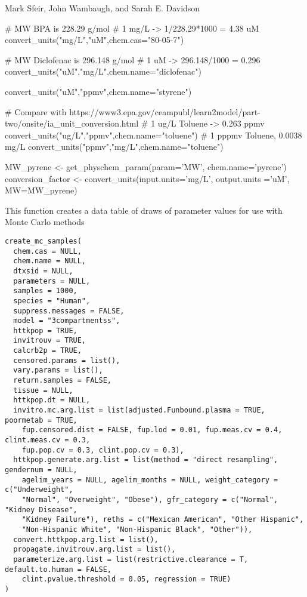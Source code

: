\documentclass[a4paper]{book}
\begin{document}
%
\begin{Author}\relax
Mark Sfeir, John Wambaugh, and Sarah E. Davidson
\end{Author}
%
\begin{Examples}
\begin{ExampleCode}

# MW BPA is 228.29 g/mol
# 1 mg/L -> 1/228.29*1000 = 4.38 uM
convert_units("mg/L","uM",chem.cas="80-05-7")

# MW Diclofenac is 296.148 g/mol
# 1 uM -> 296.148/1000 =  0.296
convert_units("uM","mg/L",chem.name="diclofenac")

convert_units("uM","ppmv",chem.name="styrene")

# Compare with https://www3.epa.gov/ceampubl/learn2model/part-two/onsite/ia_unit_conversion.html
# 1 ug/L Toluene -> 0.263 ppmv
convert_units("ug/L","ppmv",chem.name="toluene")
# 1 pppmv Toluene, 0.0038 mg/L
convert_units("ppmv","mg/L",chem.name="toluene")

MW_pyrene <- get_physchem_param(param='MW', chem.name='pyrene')
conversion_factor <- convert_units(input.units='mg/L', output.units ='uM',
  MW=MW_pyrene)

\end{ExampleCode}
\end{Examples}
%
\begin{Description}\relax
This function creates a data table of draws of parameter values for use with 
Monte Carlo methods
\end{Description}
%
\begin{Usage}
\begin{verbatim}
create_mc_samples(
  chem.cas = NULL,
  chem.name = NULL,
  dtxsid = NULL,
  parameters = NULL,
  samples = 1000,
  species = "Human",
  suppress.messages = FALSE,
  model = "3compartmentss",
  httkpop = TRUE,
  invitrouv = TRUE,
  calcrb2p = TRUE,
  censored.params = list(),
  vary.params = list(),
  return.samples = FALSE,
  tissue = NULL,
  httkpop.dt = NULL,
  invitro.mc.arg.list = list(adjusted.Funbound.plasma = TRUE, poormetab = TRUE,
    fup.censored.dist = FALSE, fup.lod = 0.01, fup.meas.cv = 0.4, clint.meas.cv = 0.3,
    fup.pop.cv = 0.3, clint.pop.cv = 0.3),
  httkpop.generate.arg.list = list(method = "direct resampling", gendernum = NULL,
    agelim_years = NULL, agelim_months = NULL, weight_category = c("Underweight",
    "Normal", "Overweight", "Obese"), gfr_category = c("Normal", "Kidney Disease",
    "Kidney Failure"), reths = c("Mexican American", "Other Hispanic",
    "Non-Hispanic White", "Non-Hispanic Black", "Other")),
  convert.httkpop.arg.list = list(),
  propagate.invitrouv.arg.list = list(),
  parameterize.arg.list = list(restrictive.clearance = T, default.to.human = FALSE,
    clint.pvalue.threshold = 0.05, regression = TRUE)
)
\end{verbatim}
\end{Usage}
\end{document}
